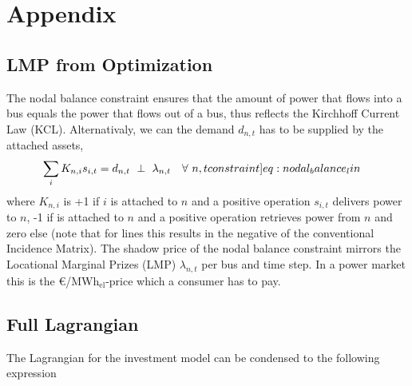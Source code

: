\documentclass[11pt,twocolumn]{article}
\newcommand{\resultsin}[1]{\hspace{6pt} \bot  \hspace{6pt} #1}
\newcommand{\Forall}[1]{\hspace{10pt} \forall \,\, #1 }
\newcommand{\state}{s_{i,t}}
\newcommand{\nodalgeneration}[1][n]{g_{#1,t}}
\newcommand{\flow}{f_{\ell,t}}
\newcommand{\lmp}[1][n]{\lambda_{#1,t}}
\newcommand{\demand}[1][n]{d_{#1,t}}
\newcommand{\nodaldemand}[1][n]{d_{#1,t}}
\newcommand{\incidence}[1][n]{K_{#1,\ell}}
\newcommand{\incidenceasset}[1][n]{K_{#1,i}}
\newcommand{\megawatthour}{MWh$_\text{el}$}
\begin{document}
\clearpage
\appendix

\section{Appendix}

\renewcommand\theequation{\thesection.\arabic{equation}}
\setcounter{equation}{0}

\renewcommand\thefigure{\thesection.\arabic{figure}}    
\setcounter{figure}{0}    

\subsection{LMP from Optimization}
The nodal balance constraint ensures that the amount of power that flows into a bus equals the power that flows out of a bus, thus reflects the Kirchhoff Current Law (KCL). Alternativaly, we can the demand $\demand$ has to be supplied by the attached assets,  
\begin{align}
    \sum_i \incidenceasset \state  &=  \demand 
     \resultsin{\lmp} \Forall{n,t}
    \label[constraint]{eq:nodal_balance_lin}
\end{align}
where $\incidenceasset$ is +1 if $i$ is attached to $n$ and a positive operation $\state$ delivers power to $n$, -1 if is attached to $n$ and a positive operation retrieves power from $n$ and zero else (note that for lines this results in the negative of the conventional Incidence Matrix).  
The shadow price of the nodal balance constraint mirrors the Locational Marginal Prizes (LMP) $\lmp$ per bus and time step. In a power market this is the \euro/\megawatthour-price which a consumer has to pay.\\

\subsection{Full Lagrangian}
\label{sec:full_lagrangian}
The Lagrangian for the investment model can be condensed to the following expression
\end{document}

